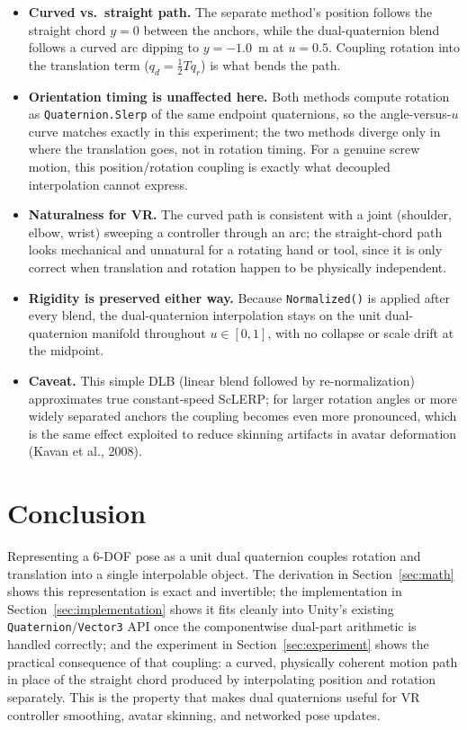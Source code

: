 \documentclass[11pt]{article}
\begin{document}
\begin{itemize}
\raggedright
  \item \textbf{Curved vs.\ straight path.} The separate method's position
    follows the straight chord $y=0$ between the anchors, while the
    dual-quaternion blend follows a curved arc dipping to $y=-1.0$~m at
    $u=0.5$. Coupling rotation into the translation term
    ($q_d = \tfrac12 T q_r$) is what bends the path.
  \item \textbf{Orientation timing is unaffected here.} Both methods compute
    rotation as \texttt{Quaternion.Slerp} of the same endpoint quaternions,
    so the angle-versus-$u$ curve matches exactly in this experiment; the two
    methods diverge only in where the translation goes, not in rotation
    timing. For a genuine screw motion, this position/rotation coupling is
    exactly what decoupled interpolation cannot express.
  \item \textbf{Naturalness for VR.} The curved path is consistent with a
    joint (shoulder, elbow, wrist) sweeping a controller through an arc; the
    straight-chord path looks mechanical and unnatural for a rotating hand or
    tool, since it is only correct when translation and rotation happen to be
    physically independent.
  \item \textbf{Rigidity is preserved either way.} Because
    \texttt{Normalized()} is applied after every blend, the dual-quaternion
    interpolation stays on the unit dual-quaternion manifold throughout
    $u \in [0,1]$, with no collapse or scale drift at the midpoint.
  \item \textbf{Caveat.} This simple DLB (linear blend followed by
    re-normalization) approximates true constant-speed ScLERP; for larger
    rotation angles or more widely separated anchors the coupling becomes
    even more pronounced, which is the same effect exploited to reduce
    skinning artifacts in avatar deformation (Kavan et al., 2008).
\end{itemize}

\section{Conclusion}

Representing a 6-DOF pose as a unit dual quaternion couples rotation and
translation into a single interpolable object. The derivation in
Section~\ref{sec:math} shows this representation is exact and invertible; the
implementation in Section~\ref{sec:implementation} shows it fits cleanly into
Unity's existing \texttt{Quaternion}/\texttt{Vector3} API once the
componentwise dual-part arithmetic is handled correctly; and the experiment
in Section~\ref{sec:experiment} shows the practical consequence of that
coupling: a curved, physically coherent motion path in place of the straight
chord produced by interpolating position and rotation separately. This is the
property that makes dual quaternions useful for VR controller smoothing,
avatar skinning, and networked pose updates.
\end{document}
